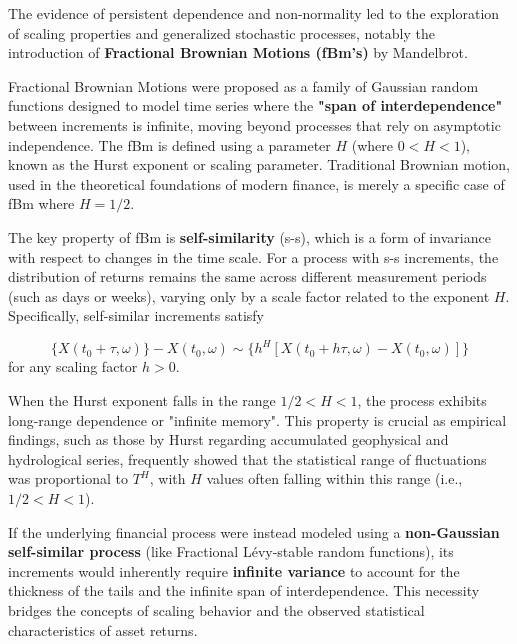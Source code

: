 \documentclass{ieeetj}
\begin{document}
The evidence of persistent dependence and non-normality led to the exploration of scaling properties and generalized stochastic processes, notably the introduction of \textbf{Fractional Brownian Motions (fBm's)} by Mandelbrot.

Fractional Brownian Motions were proposed as a family of Gaussian random functions designed to model time series where the \textbf{"span of interdependence"} between increments is infinite, moving beyond processes that rely on asymptotic independence. The fBm is defined using a parameter $H$ (where $0<H<1$), known as the Hurst exponent or scaling parameter. Traditional Brownian motion, used in the theoretical foundations of modern finance, is merely a specific case of fBm where $H=1/2$.

The key property of fBm is \textbf{self-similarity} (s-s), which is a form of invariance with respect to changes in the time scale. For a process with s-s increments, the distribution of returns remains the same across different measurement periods (such as days or weeks), varying only by a scale factor related to the exponent $H$. Specifically, self-similar increments satisfy

$$\{X(t_{0}+\tau,\omega)\}-X(t_{0},\omega)\sim \{h^{H}[X(t_{0}+h\tau,\omega)-X(t_{0},\omega)]\}$$ for any scaling factor $h>0$.

When the Hurst exponent falls in the range $1/2<H<1$, the process exhibits long-range dependence or "infinite memory". This property is crucial as empirical findings, such as those by Hurst regarding accumulated geophysical and hydrological series, frequently showed that the statistical range of fluctuations was proportional to $T^H$, with $H$ values often falling within this range (i.e., $1/2<H<1$).
 
If the underlying financial process were instead modeled using a \textbf{non-Gaussian self-similar process} (like Fractional Lévy-stable random functions), its increments would inherently require \textbf{infinite variance} to account for the thickness of the tails and the infinite span of interdependence. This necessity bridges the concepts of scaling behavior and the observed statistical characteristics of asset returns.
\end{document}
